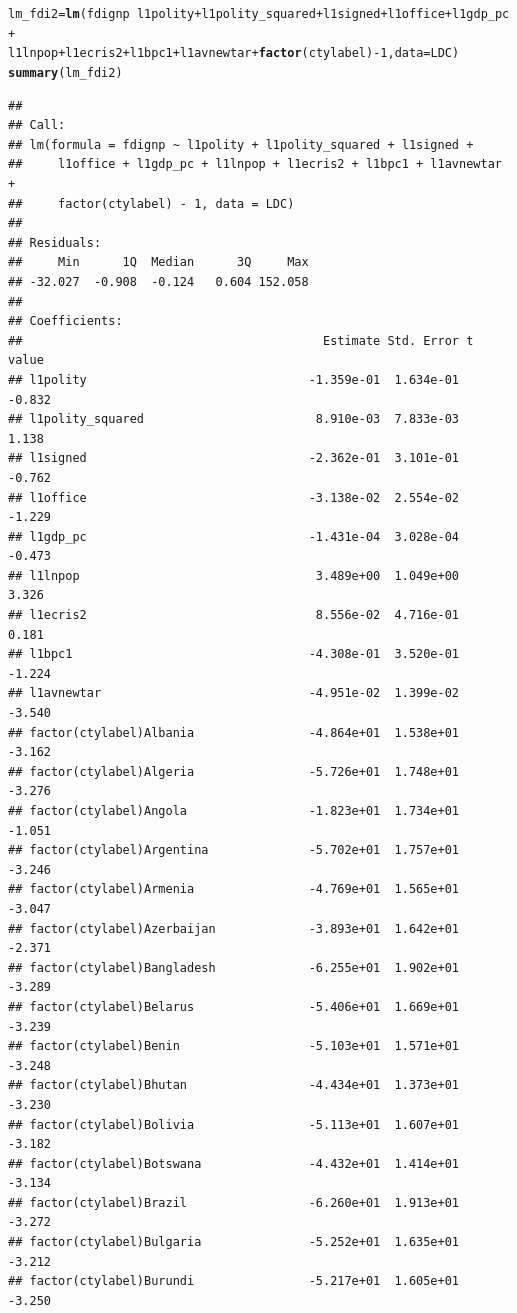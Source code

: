 \documentclass[12pt]{article}\usepackage[]{graphicx}\usepackage[]{color}
\makeatletter
\newcommand{\hlnum}[1]{\textcolor[rgb]{0.686,0.059,0.569}{#1}}%
\newcommand{\hlopt}[1]{\textcolor[rgb]{0,0,0}{#1}}%
\newcommand{\hlstd}[1]{\textcolor[rgb]{0.345,0.345,0.345}{#1}}%
\newcommand{\hlkwb}[1]{\textcolor[rgb]{0.69,0.353,0.396}{#1}}%
\newcommand{\hlkwc}[1]{\textcolor[rgb]{0.333,0.667,0.333}{#1}}%
\newcommand{\hlkwd}[1]{\textcolor[rgb]{0.737,0.353,0.396}{\textbf{#1}}}%
\newenvironment{kframe}{%
 \def\at@end@of@kframe{}%
 \ifinner\ifhmode%
  \def\at@end@of@kframe{\end{minipage}}%
  \begin{minipage}{\columnwidth}%
 \fi\fi%
 \def\FrameCommand##1{\hskip\@totalleftmargin \hskip-\fboxsep
 \colorbox{shadecolor}{##1}\hskip-\fboxsep
     \hskip-\linewidth \hskip-\@totalleftmargin \hskip\columnwidth}%
 \MakeFramed {\advance\hsize-\width
   \@totalleftmargin\z@ \linewidth\hsize
   \@setminipage}}%
 {\par\unskip\endMakeFramed%
 \at@end@of@kframe}
\newenvironment{knitrout}{}{} %
\makeatother
\begin{document}
\begin{knitrout}
\begin{kframe}
\begin{alltt}
\hlstd{lm_fdi2} \hlkwb{=} \hlkwd{lm}\hlstd{(fdignp} \hlopt{~} \hlstd{l1polity} \hlopt{+} \hlstd{l1polity_squared} \hlopt{+} \hlstd{l1signed} \hlopt{+} \hlstd{l1office} \hlopt{+} \hlstd{l1gdp_pc} \hlopt{+}
    \hlstd{l1lnpop} \hlopt{+} \hlstd{l1ecris2} \hlopt{+} \hlstd{l1bpc1} \hlopt{+} \hlstd{l1avnewtar} \hlopt{+} \hlkwd{factor}\hlstd{(ctylabel)} \hlopt{-} \hlnum{1}\hlstd{,} \hlkwc{data} \hlstd{= LDC)}
\hlkwd{summary}\hlstd{(lm_fdi2)}
\end{alltt}
\begin{verbatim}
## 
## Call:
## lm(formula = fdignp ~ l1polity + l1polity_squared + l1signed + 
##     l1office + l1gdp_pc + l1lnpop + l1ecris2 + l1bpc1 + l1avnewtar + 
##     factor(ctylabel) - 1, data = LDC)
## 
## Residuals:
##     Min      1Q  Median      3Q     Max 
## -32.027  -0.908  -0.124   0.604 152.058 
## 
## Coefficients:
##                                          Estimate Std. Error t value
## l1polity                               -1.359e-01  1.634e-01  -0.832
## l1polity_squared                        8.910e-03  7.833e-03   1.138
## l1signed                               -2.362e-01  3.101e-01  -0.762
## l1office                               -3.138e-02  2.554e-02  -1.229
## l1gdp_pc                               -1.431e-04  3.028e-04  -0.473
## l1lnpop                                 3.489e+00  1.049e+00   3.326
## l1ecris2                                8.556e-02  4.716e-01   0.181
## l1bpc1                                 -4.308e-01  3.520e-01  -1.224
## l1avnewtar                             -4.951e-02  1.399e-02  -3.540
## factor(ctylabel)Albania                -4.864e+01  1.538e+01  -3.162
## factor(ctylabel)Algeria                -5.726e+01  1.748e+01  -3.276
## factor(ctylabel)Angola                 -1.823e+01  1.734e+01  -1.051
## factor(ctylabel)Argentina              -5.702e+01  1.757e+01  -3.246
## factor(ctylabel)Armenia                -4.769e+01  1.565e+01  -3.047
## factor(ctylabel)Azerbaijan             -3.893e+01  1.642e+01  -2.371
## factor(ctylabel)Bangladesh             -6.255e+01  1.902e+01  -3.289
## factor(ctylabel)Belarus                -5.406e+01  1.669e+01  -3.239
## factor(ctylabel)Benin                  -5.103e+01  1.571e+01  -3.248
## factor(ctylabel)Bhutan                 -4.434e+01  1.373e+01  -3.230
## factor(ctylabel)Bolivia                -5.113e+01  1.607e+01  -3.182
## factor(ctylabel)Botswana               -4.432e+01  1.414e+01  -3.134
## factor(ctylabel)Brazil                 -6.260e+01  1.913e+01  -3.272
## factor(ctylabel)Bulgaria               -5.252e+01  1.635e+01  -3.212
## factor(ctylabel)Burundi                -5.217e+01  1.605e+01  -3.250

\end{verbatim}
\end{kframe}
\end{knitrout}
\end{document}

